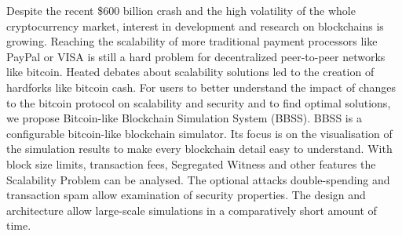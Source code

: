 Despite the recent \$600 billion crash and the high volatility of the whole cryptocurrency market, interest in development and research on blockchains is growing. Reaching the scalability of more traditional payment processors like PayPal or VISA is still a hard problem for decentralized peer-to-peer networks like bitcoin. Heated debates about scalability solutions led to the creation of hardforks like bitcoin cash. For users to better understand the impact of changes to the bitcoin protocol on scalability and security and to find optimal solutions, we propose Bitcoin-like Blockchain Simulation System (BBSS). BBSS is a configurable bitcoin-like blockchain simulator. Its focus is on the visualisation of the simulation results to make every blockchain detail easy to understand. With block size limits, transaction fees, Segregated Witness and other features the Scalability Problem can be analysed. The optional attacks double-spending and transaction spam allow examination of security properties. The design and architecture allow large-scale simulations in a comparatively short amount of time.